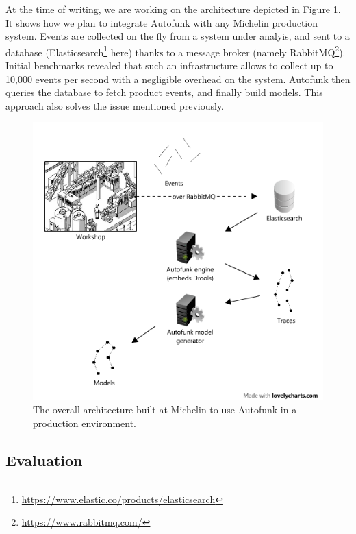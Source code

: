 At the time of writing, we are working on the architecture
depicted in Figure \ref{fig:autofunk_gen_branded}. It shows how we
plan to integrate Autofunk with any Michelin production system.
Events are collected on the fly from a system under analyis, and
sent to a database
(Elasticsearch\footnote{\url{https://www.elastic.co/products/elasticsearch}}
here) thanks to a message broker (namely
RabbitMQ\footnote{\url{https://www.rabbitmq.com/}}). Initial benchmarks
revealed that such an infrastructure allows to collect up to
10,000 events per second with a negligible overhead on the
system. Autofunk then queries the database to fetch product
events, and finally build models. This approach also solves the
issue mentioned previously.

\begin{figure}[ht]
    \includegraphics[width=1.0\linewidth]{figures/model-gen-branded.png}

    \caption{The overall architecture built at Michelin to use
    Autofunk in a production environment.}
    \label{fig:autofunk_gen_branded}
\end{figure}


\subsection{Evaluation}

